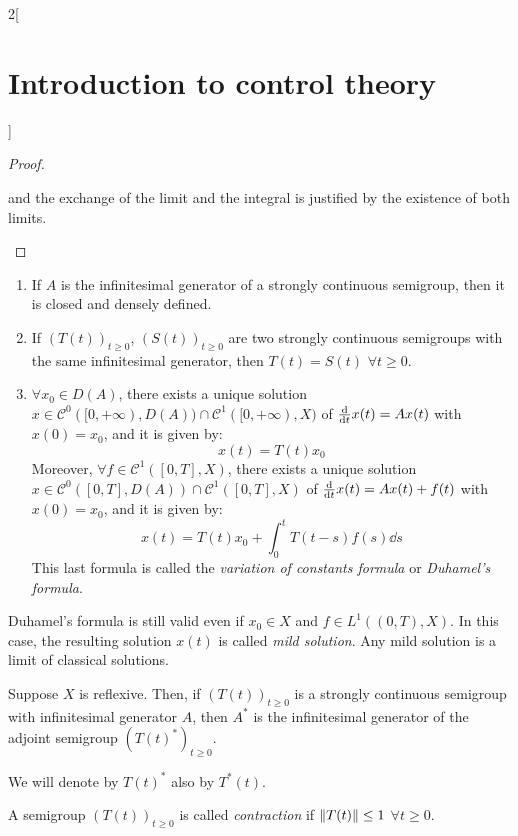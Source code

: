 \documentclass[../../../main_math.tex]{subfiles}
\begin{document}
\begin{multicols}{2}[\section{Introduction to control theory}]
\begin{proof}
\begin{enumerate}
\begin{equation*}
            \end{equation*}
            and the exchange of the limit and the integral is justified by the existence of both limits.
    \end{enumerate}
  \end{proof}
  \begin{theorem}\hfill
    \begin{enumerate}
      \item If $A$ is the infinitesimal generator of a strongly continuous semigroup, then it is closed and densely defined.
      \item If $(T(t))_{t\geq 0}$, $(S(t))_{t\geq 0}$ are two strongly continuous semigroups with the same infinitesimal generator, then $T(t)=S(t)$ $\forall t\geq 0$.
      \item $\forall x_0\in D(A)$, there exists a unique solution $x\in \mathcal{C}^0([0,+\infty),D(A))\cap \mathcal{C}^1([0,+\infty),X)$ of $\dv{}{t}x(t)=Ax(t)$ with $x(0)=x_0$, and it is given by: $$x(t)=T(t)x_0$$
            Moreover, $\forall f\in \mathcal{C}^1([0,T],X)$, there exists a unique solution $x\in \mathcal{C}^0([0,T],D(A))\cap \mathcal{C}^1([0,T],X)$ of $\dv{}{t}x(t)=Ax(t)+f(t)$ with $x(0)=x_0$, and it is given by: $$
              x(t)=T(t)x_0+\int_0^t T(t-s)f(s)\dd s
            $$
            This last formula is called the \emph{variation of constants formula} or \emph{Duhamel's formula}.
    \end{enumerate}
  \end{theorem}
  \begin{remark}
    Duhamel's formula is still valid even if $x_0\in X$ and $f\in L^1((0,T),X)$. In this case, the resulting solution $x(t)$ is called \emph{mild solution}. Any mild solution is a limit of classical solutions.
  \end{remark}
  \begin{theorem}
    Suppose $X$ is reflexive. Then, if $(T(t))_{t\geq 0}$ is a strongly continuous semigroup with infinitesimal generator $A$, then $A^*$ is the infinitesimal generator of the adjoint semigroup $(T(t)^*)_{t\geq 0}$.
  \end{theorem}
  \begin{remark}
    We will denote by $T(t)^*$ also by $T^*(t)$.
  \end{remark}
  \begin{definition}
    A semigroup $(T(t))_{t\geq 0}$ is called \emph{contraction} if $\norm{T(t)}\leq 1$ $\forall t\geq 0$.
  \end{definition}
  \begin{definition}

\end{definition}
\end{multicols}
\end{document}
